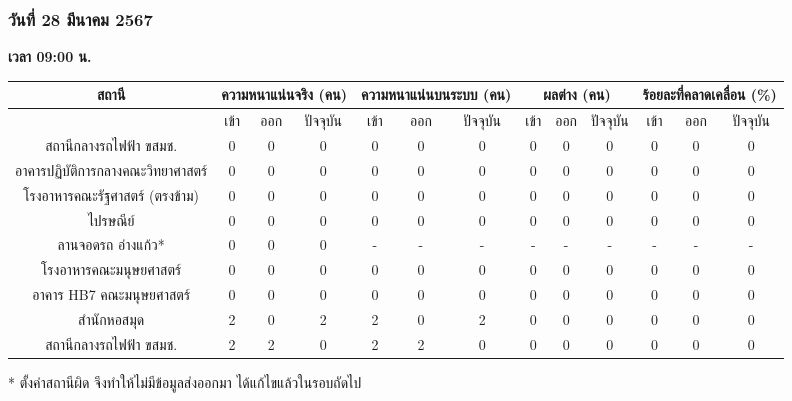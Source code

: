 \subsubsection{วันที่ 28 มีนาคม 2567}
    \textbf{เวลา 09:00 น.}
    {\tiny\begin{center}
        \begin{tabular}{ | c | c | c | c | c | c | c | c | c | c | c | c | c |  }
            \hline
                \multirow{2}{*}{สถานี} & \multicolumn{3}{|c|}{ความหนาแน่นจริง (คน)} & \multicolumn{3}{|c|}{ความหนาแน่นบนระบบ (คน)} & \multicolumn{3}{|c|}{ผลต่าง (คน)} & \multicolumn{3}{|c|}{ร้อยละที่คลาดเคลื่อน (\%)} \\
            \hline
                & เข้า & ออก & ปัจจุบัน & เข้า & ออก & ปัจจุบัน & เข้า & ออก & ปัจจุบัน & เข้า & ออก & ปัจจุบัน \\
            \hline
                สถานีกลางรถไฟฟ้า ขสมช.            & 0 & 0 & 0 & 0 & 0 & 0 & 0 & 0 & 0 & 0 & 0 & 0 \\
                อาคารปฏิบัติการกลางคณะวิทยาศาสตร์    & 0 & 0 & 0 & 0 & 0 & 0 & 0 & 0 & 0 & 0 & 0 & 0 \\
                โรงอาหารคณะรัฐศาสตร์ (ตรงข้าม)      & 0 & 0 & 0 & 0 & 0 & 0 & 0 & 0 & 0 & 0 & 0 & 0 \\
                ไปรษณีย์                          & 0 & 0 & 0 & 0 & 0 & 0 & 0 & 0 & 0 & 0 & 0 & 0 \\
                ลานจอดรถ อ่างแก้ว*                 & 0 & 0 & 0 & - & - & - & - & - & - & - & - & - \\
                โรงอาหารคณะมนุษยศาสตร์            & 0 & 0 & 0 & 0 & 0 & 0 & 0 & 0 & 0 & 0 & 0 & 0 \\
                อาคาร HB7 คณะมนุษยศาสตร์          & 0 & 0 & 0 & 0 & 0 & 0 & 0 & 0 & 0 & 0 & 0 & 0 \\
                สำนักหอสมุด                       & 2 & 0 & 2 & 2 & 0 & 2 & 0 & 0 & 0 & 0 & 0 & 0 \\
                สถานีกลางรถไฟฟ้า ขสมช.            & 2 & 2 & 0 & 2 & 2 & 0 & 0 & 0 & 0 & 0 & 0 & 0 \\
            \hline
        \end{tabular}
    \end{center}}
    * ตั้งค่าสถานีผิด จึงทำให้ไม่มีข้อมูลส่งออกมา ได้แก้ไขแล้วในรอบถัดไป

